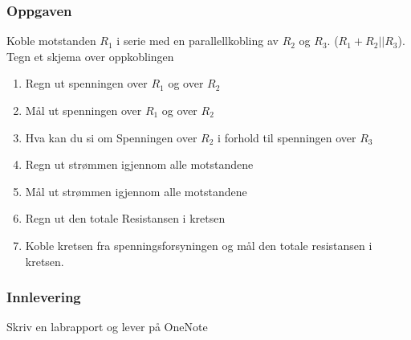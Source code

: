 \subsubsection*{Oppgaven}
Koble motstanden $R_1$ i serie med en parallellkobling av $R_2$ og $R_3$. ($R_1+R_2||R_3$). Tegn et skjema over oppkoblingen
\begin{enumerate}
	
	\item Regn ut spenningen over $R_1$ og over $R_2$
	\item Mål ut spenningen over $R_1$ og over $R_2$
	\item Hva kan du si om Spenningen over $R_2$ i forhold til spenningen over $R_3$
	\item Regn ut strømmen igjennom alle motstandene
	\item Mål ut strømmen igjennom alle motstandene 
	\item Regn ut den totale Resistansen i kretsen 
	\item Koble kretsen fra spenningsforsyningen og mål den totale resistansen i kretsen.  

\end{enumerate}

\subsubsection*{Innlevering}

Skriv en labrapport og lever på OneNote\\
\vskip 5pt 



